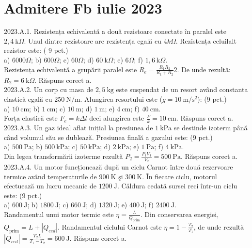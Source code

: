 \section{Admitere Fb iulie 2023}

2023.A.1. Rezistența echivalentă a două rezistoare conectate în paralel este $2,4 \mathrm{~k} \Omega$. Unul dintre rezistoare are rezistența egală cu $4 k \Omega$. Rezistența celuilalt rezistor este: ( 9 pct.)\\ a) $6000 \Omega$; b) $600 \Omega$; c) $60 \Omega$; d) $60 \mathrm{~k} \Omega$; e) $6 \Omega$; f) $1,6 \mathrm{~k} \Omega$.\\ Rezistența echivalentă a grupării paralel este $R_{e}=\frac{R_{1} R_{2}}{R_{1}+R_{2}} 2$. De unde rezultă: $R_{2}=6 \mathrm{~k} \Omega$. Răspuns corect a.\\

2023.A.2. Un corp cu masa de $2,5 \mathrm{~kg}$ este suspendat de un resort având constanta elastică egală cu $250 \mathrm{~N} / \mathrm{m}$. Alungirea resortului este ($g=10 \mathrm{~m} / \mathrm{s}^{2}$): (9 pct.)\\ a) $10 \mathrm{~cm}$; b) $1 \mathrm{~cm}$; c) $10 \mathrm{~m}$; d) $1 \mathrm{~m}$; e) $4 \mathrm{~cm}$; f) $40 \mathrm{~cm}$.\\ Forța elastică este $F_{e}=k \Delta l$ deci alungirea este $\frac{F}{k}=10 \mathrm{~cm}$. Răspuns corect a.\\

2023.A.3. Un gaz ideal aflat inițial la presiunea de $1 \mathrm{~kPa}$ se destinde izoterm până când volumul său se dublează. Presiunea finală a gazului este: (9 pct.)\\ a) $500 \mathrm{~Pa}$; b) $500 \mathrm{~kPa}$; c) $50 \mathrm{~kPa}$; d) $2 \mathrm{~kPa}$; e) $1 \mathrm{~Pa}$; f) $4 \mathrm{~kPa}$.\\ Din legea transformării izoterme rezultă $P_{2}=\frac{P_{1} V_{1}}{V_{2}}=500 \mathrm{~Pa}$. Răspuns corect a.\\

2023.A.4. Un motor funcționează după un ciclu Carnot între două rezervoare termice având temperaturile de $900 \mathrm{~K}$ şi $300 \mathrm{~K}$. În fiecare ciclu, motorul efectuează un lucru mecanic de $1200 \mathrm{~J}$. Căldura cedată sursei reci într-un ciclu este: (9 pct.)\\ a) $600 \mathrm{~J}$; b) $1800 \mathrm{~J}$; c) $660 \mathrm{~J}$; d) $1320 \mathrm{~J}$; e) $400 \mathrm{~J}$; f) $2400 \mathrm{~J}$.\\ Randamentul unui motor termic este $\eta=\frac{L}{Q_{\text {prim}}}$. Din conservarea energiei, $Q_{\text {prim}}=L+ \left|Q_{ced}\right|$. Randamentul ciclului Carnot este $\eta=1-\frac{T_{2}}{T_{1}}$, de unde rezultă $\left|Q_{ced}\right|=\frac{T_{2} L}{T_{1}-T_{2}}=600 \mathrm{~J}$. Răspuns corect a.\\

